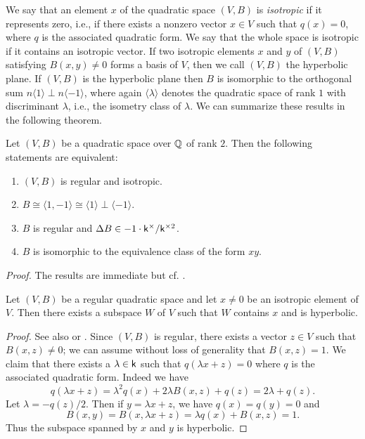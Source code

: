 We say that an element \(x\) of the quadratic space \((V,B)\) is
\emph{isotropic} if it represents zero, i.e., if there exists a nonzero vector
\(x \in V\) such that \(q(x) = 0\), where \(q\) is the associated quadratic
form. We say that the whole space is isotropic if it contains an isotropic
vector. If two isotropic elements \(x\) and \(y\) of \((V,B)\) satisfying
\(B(x,y) \neq 0\) forms a basis of \(V\), then we call \((V, B)\) the hyperbolic
plane. If \((V,B)\) is the hyperbolic plane then \(B\) is isomorphic to the
orthogonal sum \(n\langle 1 \rangle \perp n \langle -1 \rangle\), where again
\(\langle \lambda \rangle\) denotes the quadratic space of rank \(1\) with
discriminant \(\lambda\), i.e., the isometry class of \(\lambda\). We can
summarize these results in the following theorem.

\begin{theoremx}\label{thm:regular-witt} Let \((V, B)\) be a quadratic space
    over \(\mathbb{Q}\) of rank \(2\). Then the following statements are
    equivalent:

    \smallskip

    \begin{enumerate}[nosep, label=(\alph*)]
        \item \((V, B)\) is regular and isotropic.
        \item \(B \cong \langle 1, -1 \rangle \cong \langle 1 \rangle \perp
        \langle -1 \rangle\).
        \item \(B\) is regular and \({\Delta} B \in -1 \cdot \mathsf{k}^{\times}/\mathsf{k}^{\times2}\).
        \item \(B\) is isomorphic to the equivalence class of the form \(xy\).
    \end{enumerate}
\end{theoremx}

\emph{Proof.} The results are immediate but cf.
\cite[pp.~12--13]{lam1973quadratic}.

\begin{theoremx}\label{thm:hyperbolic-decomp} Let \((V,B)\) be a regular
    quadratic space and let \(x \neq 0\) be an isotropic element of \(V\). Then
    there exists a subspace \(W\) of \(V\) such that \(W\) contains \(x\) and is
    hyperbolic.
\end{theoremx}

\begin{proof}
    See also \cite[p.~13]{clarkquadratic} or \cite[p.~29]{serre2012course}.
    Since \((V,B)\) is regular, there exists a vector \(z \in V\) such that
    \(B(x,z) \neq 0\); we can assume without loss of generality that \(B(x,z) =
    1\). We claim that there exists a \(\lambda \in \mathsf{k}\) such that
    \(q(\lambda x + z) = 0\) where \(q\) is the associated quadratic form.
    Indeed we have
    \[
        q(\lambda x + z) = \lambda^2q(x) + 2\lambda B(x,z) + q(z) = 2\lambda + q(z).     
    \]
    Let \(\lambda = -q(z)/2\). Then if \(y = \lambda x + z\), we have \(q(x) =
    q(y) = 0\) and
    \[
        B(x,y) = B(x, \lambda x + z) = \lambda q(x) + B(x,z) = 1.
    \]
    Thus the subspace spanned by \(x\) and \(y\) is hyperbolic.
\end{proof}

